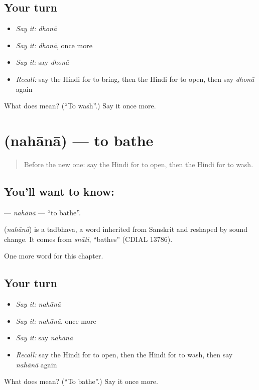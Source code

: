 \subsection*{Your turn}
\begin{itemize}
\raggedright
  \item \emph{Say it:} \emph{dhonā}
  \item \emph{Say it:} \emph{dhonā}, once more
  \item \emph{Say it:} say \emph{dhonā}
  \item \emph{Recall:} say the Hindi for to bring, then the Hindi for to open, then say \emph{dhonā} again
\end{itemize}

\begin{tcolorbox}[breakable,colback=teal!4,colframe=teal!35!black,title={Before you move on}]
What does  mean? (\textquotedblleft{}To wash\textquotedblright{}.) Say it once more.
\end{tcolorbox}
\section[\texorpdfstring{\hi{नहाना} (nahānā)}{नहाना (nahānā)}]{ (nahānā) — to bathe}

\label{lesson:HI-C160-nahana}



\begin{quote}
Before the new one: say the Hindi for to open, then the Hindi for to wash.
\end{quote}

\subsection*{You'll want to know: }
\textbf{} — \emph{nahānā} — \textquotedblleft{}to bathe\textquotedblright{}.

\begin{cousinweb}
\textbf{} (\emph{nahānā}) is a tadbhava, a word inherited from Sanskrit and reshaped by sound change. It comes from \emph{snāti}, \textquotedblleft{}bathes\textquotedblright{} (CDIAL 13786).
\end{cousinweb}

\begin{grammarlens}[title={What you've built}]
One more word for this chapter.
\end{grammarlens}

\subsection*{Your turn}
\begin{itemize}
\raggedright
  \item \emph{Say it:} \emph{nahānā}
  \item \emph{Say it:} \emph{nahānā}, once more
  \item \emph{Say it:} say \emph{nahānā}
  \item \emph{Recall:} say the Hindi for to open, then the Hindi for to wash, then say \emph{nahānā} again
\end{itemize}

\begin{tcolorbox}[breakable,colback=teal!4,colframe=teal!35!black,title={Before you move on}]
What does  mean? (\textquotedblleft{}To bathe\textquotedblright{}.) Say it once more.
\end{tcolorbox}

